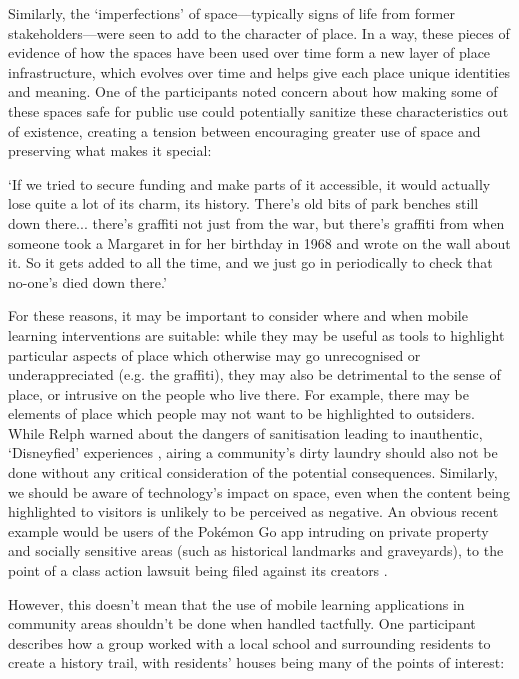 Similarly, the `imperfections' of space---typically signs of life from former stakeholders---were seen to add to the character of place. In a way, these pieces of evidence of how the spaces have been used over time form a new layer of place infrastructure, which evolves over time and helps give each place unique identities and meaning. One of the participants noted concern about how making some of these spaces safe for public use could potentially sanitize these characteristics out of existence, creating a tension between encouraging greater use of space and preserving what makes it special:

\begin{displayquote}
`If we tried to secure funding and make parts of it accessible, it would actually lose quite a lot of its charm, its history. There's old bits of park benches still down there... there's graffiti not just from the war, but there's graffiti from when someone took a Margaret in for her birthday in 1968 and wrote on the wall about it. So it gets added to all the time, and we just go in periodically to check that no-one's died down there.'
\end{displayquote}

For these reasons, it may be important to consider where and when mobile learning interventions are suitable: while they may be useful as tools to highlight particular aspects of place which otherwise may go unrecognised or underappreciated (e.g. the graffiti), they may also be detrimental to the sense of place, or intrusive on the people who live there. For example, there may be elements of place which people may not want to be highlighted to outsiders. While Relph warned about the dangers of sanitisation leading to inauthentic, `Disneyfied' experiences \citep{Relph2018}, airing a community's dirty laundry should also not be done without any critical consideration of the potential consequences. Similarly, we should be aware of technology's impact on space, even when the content being highlighted to visitors is unlikely to be perceived as negative. An obvious recent example would be users of the Pok\'emon Go app intruding on private property and socially sensitive areas (such as historical landmarks and graveyards), to the point of a class action lawsuit being filed against its creators \citep{Marder2016}.

However, this doesn't mean that the use of mobile learning applications in community areas shouldn't be done when handled tactfully. One participant describes how a group worked with a local school and surrounding residents to create a history trail, with residents' houses being many of the points of interest:

